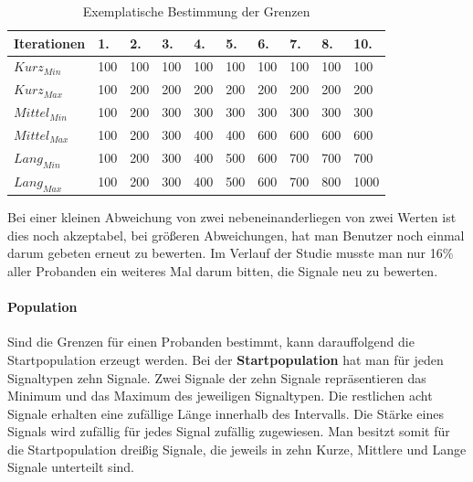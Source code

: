 \begin{table}[]
\centering
\caption{Exemplatische Bestimmung der Grenzen}
\label{bestimmunggrenzen}
\begin{tabular}{l|l|l|l|l|l|l|l|l|l}
Iterationen            & 1. & 2. & 3. & 4. & 5. & 6. & 7. & 8. & 10. \\ \hline
$Kurz_{Min}$   & 100          & 100          & 100          & 100          & 100          & 100          & 100          & 100          & 100           \\ \hline
$Kurz_{Max}$   & 100          & 200          & 200          & 200          & 200          & 200          & 200          & 200          & 200           \\ \hline
$Mittel_{Min}$ & 100          & 200          & 300          & 300          & 300          & 300          & 300          & 300          & 300           \\ \hline
$Mittel_{Max}$ & 100          & 200          & 300          & 400          & 400          & 600          & 600          & 600          & 600           \\ \hline
$Lang_{Min}$   & 100          & 200          & 300          & 400          & 500          & 600          & 700          & 700          & 700           \\ \hline
$Lang_{Max}$   & 100          & 200          & 300          & 400          & 500          & 600          & 700          & 800          & 1000          \\ %
\end{tabular}
\end{table}

Bei einer kleinen Abweichung von zwei nebeneinanderliegen von zwei Werten ist dies noch akzeptabel, bei gr{\"o}{\ss}eren Abweichungen, hat man Benutzer noch einmal darum gebeten erneut zu bewerten. Im Verlauf der Studie musste man nur 16\% aller Probanden ein weiteres Mal darum bitten, die Signale neu zu bewerten. 

\paragraph{Population}

Sind die Grenzen f{\"u}r einen Probanden bestimmt, kann darauffolgend die Startpopulation erzeugt werden.
Bei der \textbf{Startpopulation} hat man f{\"u}r jeden Signaltypen zehn Signale. 
Zwei Signale der zehn Signale repr{\"a}sentieren das Minimum und das Maximum des jeweiligen Signaltypen.
Die restlichen acht Signale erhalten eine zuf{\"a}llige L{\"a}nge innerhalb des Intervalls. Die St{\"a}rke eines Signals wird zuf{\"a}llig f{\"u}r jedes Signal zuf{\"a}llig zugewiesen. 
Man besitzt somit f{\"u}r die Startpopulation drei{\ss}ig Signale, die jeweils in zehn Kurze, Mittlere und Lange Signale unterteilt sind. 

